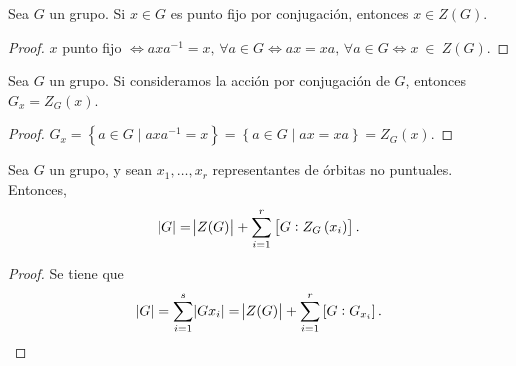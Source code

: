 \begin{prop}
    Sea $G$ un grupo. Si $x \in G$ es punto fijo por conjugación, entonces $x \in Z(G)$.
\end{prop}
\begin{proof}
    $x$ punto fijo $\iff axa^{-1} = x,\,\forall a \in G \iff ax = xa,\, \forall a \in G \iff x~\in~Z(G)$.
\end{proof}

\begin{prop}
    Sea $G$ un grupo. Si consideramos la acción por conjugación de $G$, entonces $G_x = Z_G(x)$.
\end{prop}
\begin{proof}
    $G_x = \left\{ a \in G \mid axa^{-1} = x \right\} = \left\{ a \in G \mid ax = xa \right\} = Z_G(x)$.
\end{proof}

\begin{prop}\label{prop_form_orbitas}
    Sea $G$ un grupo, y sean $x_1, \dots, x_r$ representantes de órbitas no puntuales. Entonces,
    \[
        \abs{G} = \abs{Z(G)} + \sum^r_{i=1} \left[ G : Z_G\left( x_i \right) \right].
    \]
\end{prop}
\begin{proof}
    Se tiene que
    \[
        \abs{G} = \sum^s_{i=1} \abs{Gx_i} = \abs{Z(G)} + \sum^r_{i=1} \left[ G : G_{x_i} \right].
    \]
\end{proof}

